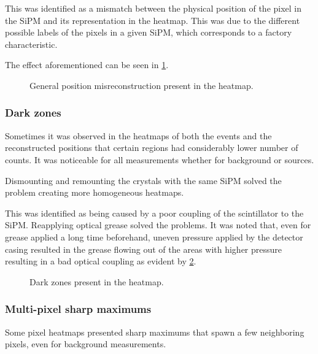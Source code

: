 This was identified as a mismatch between the physical position of the pixel in the \ac{SiPM} and its representation in the heatmap.
This was due to the different possible labels of the pixels in a given \ac{SiPM}, which corresponds to a factory characteristic.

The effect aforementioned can be seen in \ref{fig:PositionMisreconstructionHeatmap}.

\begin{figure}[h!]
    \centering
    \caption{General position misreconstruction present in the heatmap.}%
    \label{fig:PositionMisreconstructionHeatmap}
\end{figure}

\subsubsection{Dark zones}

Sometimes it was observed in the heatmaps of both the events and the reconstructed positions that certain regions had considerably lower number of counts. It was  noticeable for all measurements whether for background or sources.

Dismounting and remounting the crystals with the same \ac{SiPM} solved the problem creating more homogeneous heatmaps.

This was identified as being caused by a poor coupling of the scintillator to the \ac{SiPM}. Reapplying optical grease solved the problems. It was noted that, even for grease applied a long time beforehand, uneven pressure applied by the detector casing resulted in the grease flowing out of the areas with higher pressure resulting in a bad optical coupling as evident by \ref{fig:DarkZonesHeatmap}.

\begin{figure}[h!]
    \centering
    \qquad
    \caption{Dark zones present in the heatmap.}%
    \label{fig:DarkZonesHeatmap}
\end{figure}

\subsubsection{Multi-pixel sharp maximums}

Some pixel heatmaps presented sharp maximums that spawn a few neighboring pixels, even for background measurements.

